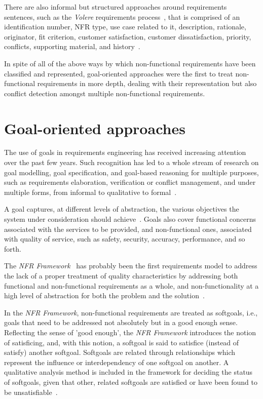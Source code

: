 \documentclass[dissertation,final]{softeng}
\newcommand{\nfrs}{non-functional requirements\xspace}
\begin{document}
There are also informal but structured approaches around requirements sentences, such as the \emph{Volere} requirements process~\citep{Robertson:1999}, that is comprised of an identification number, NFR type, use case related to it, description, rationale, originator, fit criterion, customer satisfaction, customer dissatisfaction, priority, conflicts, supporting material, and history~\citep{Chung:2009vg}.

In spite of all of the above ways by which non-functional requirements have been classified and represented, goal-oriented approaches were the first to treat \nfrs in more depth, dealing with their representation but also conflict detection amongst multiple non-functional requirements. 

\section{Goal-oriented approaches}
The use of goals in requirements engineering has received increasing attention over the past few years. Such recognition has led to a whole stream of research on goal modelling, goal specification, and goal-based reasoning for multiple purposes, such as requirements elaboration, verification or conflict management, and under multiple forms, from informal to qualitative to formal~\citep{Lamsweerde:2001wpba}.

A goal captures, at different levels of abstraction, the various objectives the system under consideration should achieve~\citep{Lamsweerde:2001wpba}. Goals also cover functional concerns associated with the services to be provided, and non-functional ones, associated with quality of service, such as safety, security, accuracy, performance, and so forth.

The \emph{NFR Framework}~\citep{Chung2000} has probably been the first requirements model to address the lack of a proper treatment of quality characteristics by addressing both functional and non-functional requirements as a whole, and non-functionality at a high level of abstraction for both the problem and the solution~\citep{Chung:2009vg}.

In the \emph{NFR Framework}, non-functional requirements are treated as softgoals, i.e., goals that need to be addressed not absolutely but in a good enough sense. Reflecting the sense of 'good enough', the \emph{NFR Framework} introduces the notion of satisficing, and, with this notion, a softgoal is said to satisfice (instead of satisfy) another softgoal. Softgoals are related through relationships which represent the influence or interdependency of one softgoal on another. A qualitative analysis method is included in the framework for deciding the status of softgoals, given that other, related softgoals are satisfied or have been found to be unsatisfiable~\citep{Chung2000}.
\end{document}
